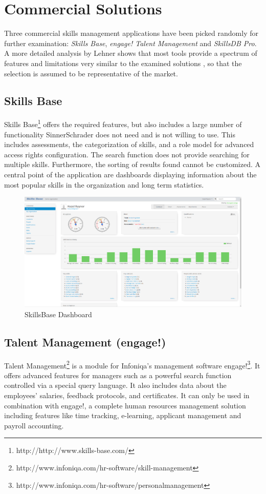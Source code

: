 \section{Commercial Solutions}
\label{commercial}
Three commercial skills management applications have been picked randomly for further examination: \textit{Skills Base}, \textit{engage! Talent Management} and \textit{SkillsDB Pro}.
A more detailed analysis by Lehner shows that most tools provide a spectrum of features and limitations very similar to the examined solutions \cite{Marktanalyse}, so that the selection is assumed to be representative of the market.

\subsection{Skills Base}
Skills Base\footnote{http://http://www.skills-base.com/} offers the required features, but also includes a large number of functionality SinnerSchrader does not need and is not willing to use. This includes assessments, the categorization of skills, and a role model for advanced access rights configuration.
The search function does not provide searching for multiple skills. Furthermore, the sorting of results found cannot be customized. A central point of the application are dashboards displaying information about the most popular skills in the organization and long term statistics.
\begin{figure}[!htp]
    \centering
    \includegraphics[width=\textwidth]{images/skillsbase-dashboard.png}
    \caption{SkillsBase Dashboard}
    \label{fig:skillsbase_dashboard}
\end{figure}

\subsection{Talent Management (engage!)}
Talent Management\footnote{http://www.infoniqa.com/hr-software/skill-management} is a module for Infoniqa’s management software engage!\footnote{http://www.infoniqa.com/hr-software/personalmanagement}. It offers advanced features for managers such as a powerful search function controlled via a special query language. It also includes data about the employees’ salaries, feedback protocols, and certificates. It can only be used in combination with engage!, a complete human resources management solution including features like time tracking, e-learning, applicant management and payroll accounting.


